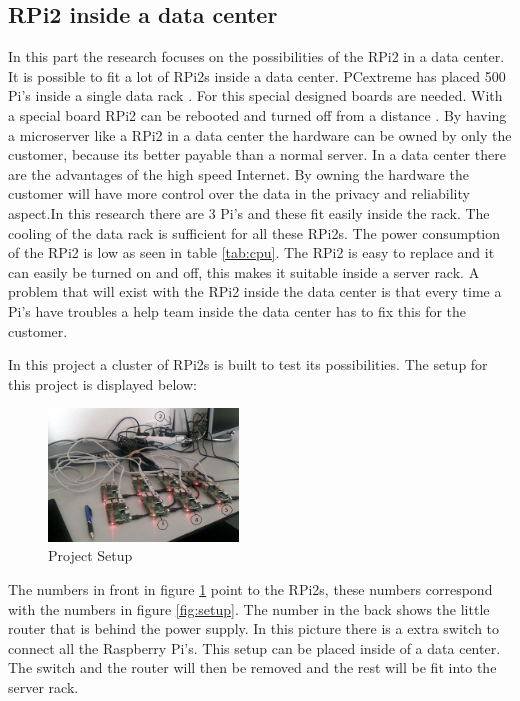 \documentclass{sig-alternate-br}
\begin{document}
\subsection{RPi2 inside a data center}

In this part the research focuses on the possibilities of the RPi2 in a data center. \newline
It is possible to fit a lot of RPi2s inside a data center. PCextreme has placed 500 Pi's inside a single data rack \cite{Pcextreme}. For this special designed boards are needed. With a special board RPi2 can be rebooted and turned off from a distance \cite{Pcextreme}. By having a microserver like a RPi2 in a data center the hardware can be owned by only the customer, because its better payable than a normal server. In a data center there are the advantages of the high speed Internet. By owning the hardware the customer will have more control over the data in the privacy and reliability aspect.\newline In this research there are 3 Pi's and these fit easily inside the rack. The cooling of the data rack is sufficient for all these RPi2s. The power consumption of the RPi2 is low as seen in table \ref{tab:cpu}. The RPi2 is easy to replace and it can easily be turned on and off, this makes it suitable inside a server rack. A problem that will exist with the RPi2 inside the data center is that every time a Pi's have troubles a help team inside the data center has to fix this for the customer. 

In this project a cluster of RPi2s is built to test its possibilities. The setup for this project is displayed below:
\begin{figure}[H]
	\centering 
	\includegraphics[width=0.45\textwidth]{setup.jpg}
	\caption{Project Setup}
	\label{fig:projectsetup} %
\end{figure}
The numbers in front in figure \ref{fig:projectsetup} point to the RPi2s, these numbers correspond with the numbers in figure \ref{fig:setup}. The number in the back shows the little router that is behind the power supply. In this picture there is a extra switch to connect all the Raspberry Pi's. \newline 
This setup can be placed inside of a data center. The switch and the router will then be removed and the rest will be fit into the server rack. 
\end{document}
